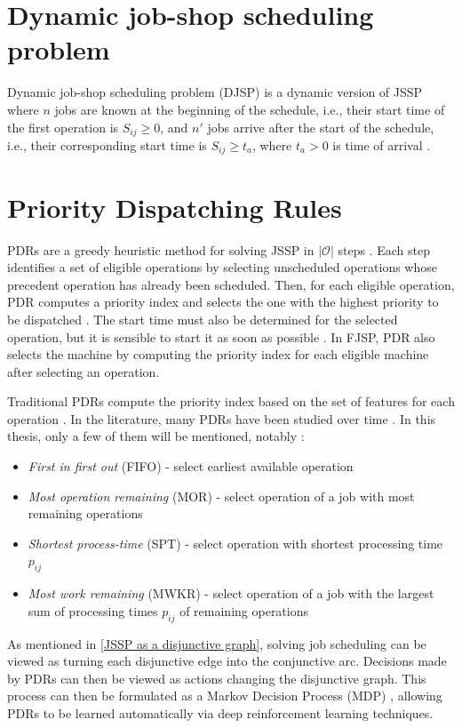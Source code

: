 \section{Dynamic job-shop scheduling problem}

Dynamic job-shop scheduling problem (DJSP) is a dynamic version of JSSP where $n$ jobs are known at the beginning of the schedule, i.e., their start time of the first operation is $S_{ij} \geq 0$, and $n'$ jobs arrive after the start of the schedule, i.e., their corresponding start time is $S_{ij} \geq t_a$, where $t_a > 0$ is time of arrival \cite{KUNDAKCI201631, Haupt_1989a}.

\section{Priority Dispatching Rules} \label{priority dispatching rules}
PDRs are a greedy heuristic method for solving JSSP in $\left|\mathcal{O}\right|$ steps \cite{zhang2020learning}. Each step identifies a set of eligible operations by selecting unscheduled operations whose precedent operation has already been scheduled. Then, for each eligible operation, PDR computes a priority index and selects the one with the highest priority to be dispatched \cite{zhang2020learning}. The start time must also be determined for the selected operation, but it is sensible to start it as soon as possible \cite{discovering_dispatching_rules}. In FJSP, PDR also selects the machine by computing the priority index for each eligible machine after selecting an operation.
\par
Traditional PDRs compute the priority index based on the set of features for each operation \cite{Haupt_1989a}. In the literature, many PDRs have been studied over time \cite{doi:10.1080/00207543.2011.611539, Haupt_1989a, discovering_dispatching_rules, 7232991}. In this thesis, only a few of them will be mentioned, notably \cite{10226873, Haupt_1989a}:
\begin{itemize}
    \item \textit{First in first out} (FIFO) - select earliest available operation 
    \item \textit{Most operation remaining} (MOR) - select operation of a job with most remaining operations
    \item \textit{Shortest process-time} (SPT) - select operation with shortest processing time $p_{ij}$
    \item \textit{Most work remaining} (MWKR) - select operation of a job with the largest sum of processing times $p_{ij}$ of remaining operations
\end{itemize}
As mentioned in \ref{JSSP as a disjunctive graph}, solving job scheduling can be viewed as turning each disjunctive edge into the conjunctive arc. Decisions made by PDRs can then be viewed as actions changing the disjunctive graph. This process can then be formulated as a Markov Decision Process (MDP) \cite{zhang2020learning, jssp_rl_env}, allowing PDRs to be learned automatically via deep reinforcement learning techniques.


